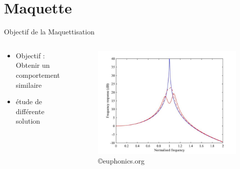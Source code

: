 \documentclass{beamer}
\begin{document}
	\section{Maquette} 
	\begin{frame}{Objectif de la Maquettisation}
		\begin{columns}
		\begin{column}{0.3\textwidth}
			
		
		
		\begin{itemize}
			\item Objectif : Obtenir un comportement similaire 
			\item étude de différente solution
		\end{itemize}
	\end{column}
	\begin{column}{0.7\textwidth}
		\begin{figure}
			\includegraphics[width=\textwidth]{Image/Objectif en courbe.jpg}
			\caption{\copyright euphonics.org}
		\end{figure}
	\end{column}
	\end{columns}
	\end{frame}
\end{document}
